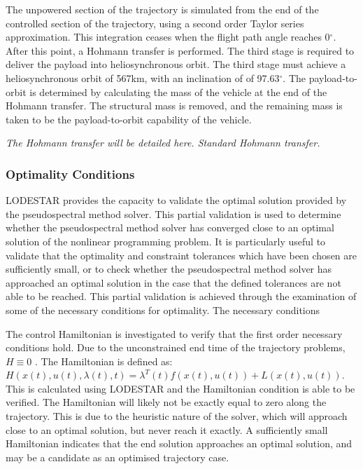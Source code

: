 The unpowered section of the trajectory is simulated from the end of the controlled section of the trajectory, using a second order Taylor series approximation. This integration ceases when the flight path angle reaches 0$^{\circ}$. After this point, a Hohmann transfer is performed. The third stage is required to deliver the payload into heliosynchronous orbit. The third stage must achieve a heliosynchronous orbit of 567km, with an inclination of of 97.63$^\circ$.  The payload-to-orbit
is determined by calculating the mass of the vehicle at the end of the Hohmann transfer. The structural mass is removed,
and the remaining mass is taken to be the payload-to-orbit capability of the vehicle.

\textit{The Hohmann transfer will be detailed here. Standard Hohmann transfer.}




\subsubsection{Optimality Conditions}

LODESTAR provides the capacity to validate the optimal solution provided by the pseudospectral method solver. This partial validation is used to determine whether the pseudospectral method solver has converged close to an optimal solution of the nonlinear programming problem. It is particularly useful to validate that the optimality and constraint tolerances which have been chosen are sufficiently small, or to check whether the pseudospectral method solver has approached an optimal solution in the case that the defined tolerances are not able to be reached.   
This partial validation is achieved through the examination of some of the necessary conditions for optimality. The necessary conditions 

The control Hamiltonian is investigated to verify that the first order necessary conditions hold. Due to the unconstrained end time of the trajectory problems, $H\equiv 0 $ \cite{Pucci2007}. The Hamiltonian is defined as: $H(x(t),u(t),\lambda(t),t) = \lambda^T(t)f(x(t),u(t))+L(x(t),u(t))$.
This is calculated using LODESTAR and the Hamiltonian condition is able to be verified. The Hamiltonian will likely not be exactly equal to zero along the trajectory. This is due to the heuristic nature of the solver, which will approach close to an optimal solution, but never reach it exactly. A sufficiently small Hamiltonian indicates that the end solution approaches an optimal solution, and may be a candidate as an optimised trajectory case. 


